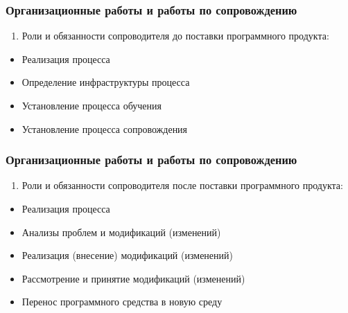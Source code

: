 \documentclass{../industrial-development}
\begin{document}
\lecturenotes


\begin{frame} \frametitle{Организационные работы и работы по сопровождению}
	\begin{enumerate} \item Роли и обязанности сопроводителя до поставки программного продукта:\end{enumerate}
	\begin{itemize}
	\item Реализация процесса 
	\item Определение инфраструктуры процесса 
	\item Установление процесса обучения 
	\item Установление процесса сопровождения 
	\end{itemize}
\end{frame}

\lecturenotes

\begin{frame} \frametitle{Организационные работы и работы по сопровождению}
	\begin{enumerate}[2] \item Роли и обязанности сопроводителя после поставки программного продукта:  \end{enumerate}
	\begin{itemize}
		\item Реализация процесса
		\item Анализы проблем и модификаций (изменений)  
		\item Реализация (внесение) модификаций (изменений) 
		\item Рассмотрение и принятие модификаций (изменений) 
		\item Перенос программного средства в новую среду
	\end{itemize}
\end{frame}

\lecturenotes
\end{document}
